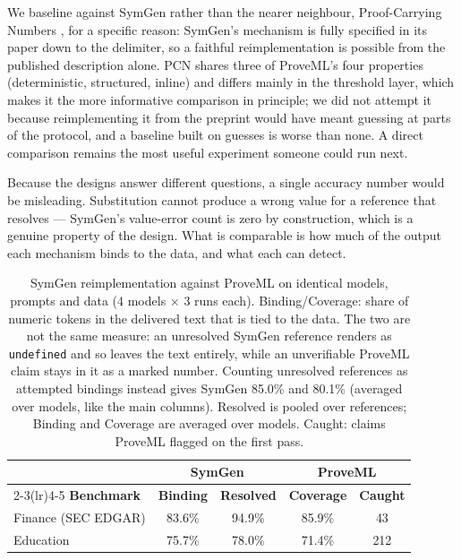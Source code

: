 \documentclass[11pt,a4paper]{article}
\begin{document}
We baseline against SymGen rather than the nearer neighbour, Proof-Carrying Numbers \citep{pcn2025}, for a specific reason: SymGen's mechanism is fully specified in its paper down to the delimiter, so a faithful reimplementation is possible from the published description alone. PCN shares three of ProveML's four properties (deterministic, structured, inline) and differs mainly in the threshold layer, which makes it the more informative comparison in principle; we did not attempt it because reimplementing it from the preprint would have meant guessing at parts of the protocol, and a baseline built on guesses is worse than none. A direct comparison remains the most useful experiment someone could run next.

Because the designs answer different questions, a single accuracy number would be misleading. Substitution cannot produce a wrong value for a reference that resolves --- SymGen's value-error count is zero by construction, which is a genuine property of the design. What is comparable is how much of the output each mechanism binds to the data, and what each can detect.

\begin{table}[h]
\centering
\small
\begin{tabular}{lcccc}
\toprule
& \multicolumn{2}{c}{\textbf{SymGen}} & \multicolumn{2}{c}{\textbf{ProveML}} \\
\cmidrule(lr){2-3}\cmidrule(lr){4-5}
\textbf{Benchmark} & \textbf{Binding} & \textbf{Resolved} & \textbf{Coverage} & \textbf{Caught} \\
\midrule
Finance (SEC EDGAR) & 83.6\% & 94.9\% & 85.9\% & 43 \\
Education & 75.7\% & 78.0\% & 71.4\% & 212 \\
\bottomrule
\end{tabular}
\caption{SymGen reimplementation against ProveML on identical models, prompts and data (4 models $\times$ 3 runs each). Binding/Coverage: share of numeric tokens in the delivered text that is tied to the data. The two are not the same measure: an unresolved SymGen reference renders as \texttt{undefined} and so leaves the text entirely, while an unverifiable ProveML claim stays in it as a marked number. Counting unresolved references as attempted bindings instead gives SymGen 85.0\% and 80.1\% (averaged over models, like the main columns). Resolved is pooled over references; Binding and Coverage are averaged over models. Caught: claims ProveML flagged on the first pass.}
\label{tab:symgen}
\end{table}
\end{document}
